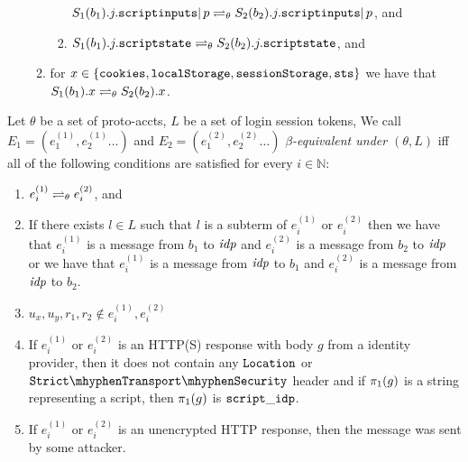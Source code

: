 \begin{theorem}
\begin{definition}
\begin{enumerate}
\begin{enumerate}
\begin{enumerate}
          $S_1(b_1).j.\mathtt{scriptinputs} |\, p \rightleftharpoons_{\theta}
          S_2(b_2).j.\mathtt{scriptinputs} |\, p$, and
        \item\label{eqs:rp:b:w:script}
          $S_1(b_1).j.\mathtt{scriptstate} \rightleftharpoons_{\theta}
          S_2(b_2).j.\mathtt{scriptstate}$, and 
        \end{enumerate}
      \item\label{eqs:rp:b:misc} for
        $x \in \{\mathtt{cookies},\mathtt{localStorage},\mathtt{sessionStorage},\mathtt{sts}\}$
        we have that $S_1(b_1).x \rightleftharpoons_{\theta} S_2(b_2).x$.
      \end{enumerate}
    \end{enumerate}
  \end{definition}
  
  \begin{definition}\label{def:rp:Events}
    Let $\theta$ be a set of proto-accts, 
    $L$ be a set of login session tokens, 
    We call $E_1 = (e_1^{(1)}, e_2^{(1)}\dots)$ and
    $E_2= (e_1^{(2)}, e_2^{(2)} \dots)$ 
    \emph{$\beta$-equivalent under $(\theta, L)$} 
    iff all of the following conditions are satisfied for every 
    $i \in \mathbb{N}$:
  
    \begin{enumerate}
      \item\label{eqe:rp:distinction} 
        $e_i^{(1)} \rightleftharpoons_{\theta} e_i^{(2)}$, and
      \item\label{eqe:rp:pre:l} If there exists $l \in L$ such that $l$ is a
        subterm of $e_i^{(1)}$ or $e_i^{(2)}$ then we have that
        $e_i^{(1)}$ is a message from $b_1$ to $\mathit{idp}$ and $e_i^{(2)}$ is a
        message from $b_2$ to $\mathit{idp}$ or we have that $e_i^{(1)}$ is a
        message from $\mathit{idp}$ to $b_1$ and $e_i^{(2)}$ is a message from
        $\mathit{idp}$ to $b_2$.
      \item\label{eqe:rp:pre:t} $u_x, u_y, r_1, r_2 \not\in e_i^{(1)}, e_i^{(2)}$
      \item\label{eqe:pre:idp-scripts} If $e_i^{(1)}$ or $e_i^{(2)}$ is an
        HTTP(S) response with body $g$ from a identity provider, then it does
        not contain any $\mathtt{Location}$ or $\cSTS$ header
        and if $\pi_{1}({g})$ is a string representing a script, then
        $\pi_{1}({g})$ is $\mathtt{script\_idp}$.
      \item\label{eqe:rp:pre:unencrypted-http} 
        If $e_i^{(1)}$ or $e_i^{(2)}$ is an unencrypted HTTP 
        response, then the message was sent by some attacker.
    \end{enumerate}
  \end{definition}
  

\end{theorem}

